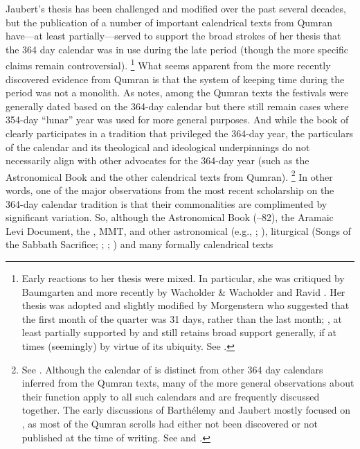Jaubert's thesis has been challenged and modified over the past several decades, but the publication of a number of important calendrical texts from Qumran have---at least partially---served to support the broad strokes of her thesis that the 364 day calendar was in use during the late \secondtemple period (though the more specific claims remain controversial).%
    \footnote{Early reactions to her thesis were mixed. In particular, she was critiqued by Baumgarten 
    \cite*{baumgarten_baumgarten1977} and more recently by Wacholder \& Wacholder 
    \cite*{wacholder-wacholder_huca1995} and Ravid 
    \cite*{ravid_dsd2003}. Her thesis was adopted and slightly modified by Morgenstern who suggested that the first month of the quarter was 31 days, rather than the last month; 
    \cite*{morgenstern_vt1955}, at least partially supported by \vanderkam 
    \cite*[410--411]{vanderkam_cbq1979} and still retains broad support generally, if at times (seemingly) by virtue of its ubiquity. See 
    \cite[142]{bendov-saulnier_cbr2008}.}
What seems apparent from the more recently discovered evidence from Qumran is that the system of keeping time during the \secondtemple period was not a monolith. As \vanderkam notes, among the Qumran texts the festivals were generally dated based on the 364-day calendar but there still remain cases where 354-day ``lunar'' year was used for more general purposes.\autocite[1:45]{vanderkam2018} And while the book of \jub clearly participates in a tradition that privileged the 364-day year, the particulars of the \jub calendar and its theological and ideological underpinnings do not necessarily align with other advocates for the 364-day year (such as the Astronomical Book and the other calendrical texts from Qumran).%
    \footnote{See \cite[,159]{bendov-saulnier_cbr2008}. Although the calendar of \jub is distinct from other 364 day calendars inferred from the Qumran texts, many of the more general observations about their function apply to all such calendars and are frequently discussed together. The early discussions of Barthélemy and Jaubert mostly focused on \jub, as most of the Qumran scrolls had either not been discovered or not published at the time of writing. See \cite{barthelemy_rb1952} and \cite{jaubert_vt1957}.}
In other words, one of the major observations from the most recent scholarship on the 364-day calendar tradition is that their commonalities are complimented by significant variation. So, although the Astronomical Book (--82), the Aramaic Levi Document, the  \templescroll, MMT,  and other astronomical (e.g., ; ), liturgical (Songs of the Sabbath Sacrifice; ; ; ) and many formally calendrical texts%
